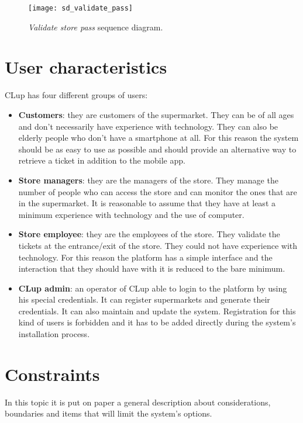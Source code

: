 \begin{figure}[H]
    \centering
    \texttt{[image: sd\_validate\_pass]}
    \caption{\textit{Validate store pass} sequence diagram.}
\end{figure}



\section{User characteristics}
CLup has four different groups of users:
\begin{itemize}
	\item \textbf{Customers}: they are customers of the supermarket. They can be of all ages and don't necessarily have experience with technology. They can also be elderly	people who don't have a smartphone at all. For this reason the system should be as easy to use as possible and should provide an alternative way to retrieve a ticket in addition to the mobile app.
	
	\item \textbf{Store managers}: they are the managers of the store. They manage the number of people who can access the store and can monitor the ones that are in the supermarket. It is reasonable to assume that they have at least a minimum experience with technology and the use of computer.
	
	\item \textbf{Store employee}: they are the employees of the store. They validate the tickets at the entrance/exit of the store. They could not have experience with technology. For this reason the platform has a simple interface and the interaction that they should have with it is reduced to the bare minimum.
	
    \item \textbf{CLup admin}: an operator of CLup able to login to the platform by using his special credentials. It can register supermarkets and generate their credentials. It can also maintain and update the system. Registration for this kind of users is forbidden and it has to be added directly during the system's installation process.
\end{itemize}

\section{Constraints}
In this topic it is put on paper a general description about considerations, boundaries and items that will limit the system's options.

